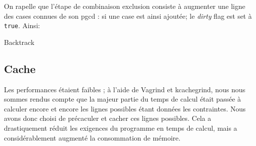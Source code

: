 On rapelle que l'étape de combinaison exclusion consiste à augmenter une ligne des cases connues de son pgcd : si une case est ainsi ajoutée; le \emph{dirty} flag est set à \texttt{true}. Ainsi:
\begin{algorithm}[H]
    Backtrack\;


\subsection{Cache}

Les performances étaient faibles ; à l'aide de Vagrind et kcachegrind, nous nous sommes rendus compte que la majeur partie du temps de calcul était passée à calculer encore et encore les lignes possibles étant données les contraintes. Nous avons donc choisi de précaculer et cacher ces lignes possibles. Cela a drastiquement réduit les exigences du programme en temps de calcul, mais a considérablement augmenté la consommation de mémoire.
\end{algorithm}

